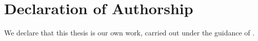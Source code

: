 \chapter*{Declaration of Authorship}
\label{commitment}
We declare that this thesis is our own work, carried out under the guidance
of \advisorNames.
